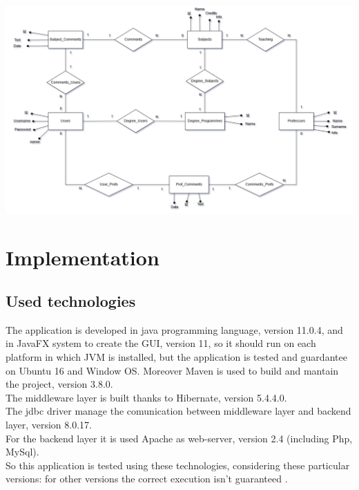 \documentclass[a4paper, oneside]{article}
\begin{document}
\begin{minipage}{\linewidth}
\begin{center}
\vspace{1mm}
\includegraphics[width=155mm]{./images/diagrams/er_diagram.png} 
\vspace{2mm}
\label{fig:diagramma_er}
\end{center}
\end{minipage}

\vspace{19mm}



\clearpage


\section{Implementation}
\subsection{Used technologies}
The application is developed in java programming language, version 11.0.4, and in JavaFX system to create the GUI, version 11, so it should run on each platform in which JVM is installed, but the application is tested and guardantee on Ubuntu 16 and Window OS. Moreover Maven is used  to build and mantain the project, version 3.8.0. \\
The middleware layer is built thanks to Hibernate, version 5.4.4.0.\\
The jdbc driver manage the comunication between middleware layer and backend layer, version 8.0.17.\\ 
For the backend layer it is used Apache as web-server, version 2.4 (including Php, MySql).\\
So this application is tested using these technologies, considering these particular versions: for other versions the correct execution isn't guaranteed .
\end{document}
